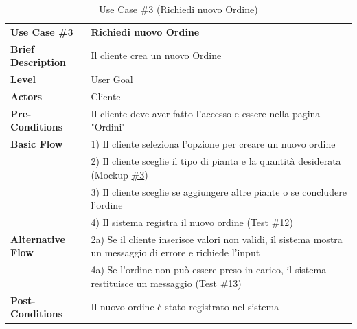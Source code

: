 \documentclass{article}
\begin{document}
    
    \begin{table}[p]
        \begin{tabularx}{\textwidth}{ | l  X | }
            \rowcolor{lightgray!70}
            \hline
            \textbf{Use Case \#3} & \textbf{Richiedi nuovo Ordine} \\[0.5ex]
            \textbf{Brief Description} & Il cliente crea un nuovo Ordine \\
            \rowcolor{blue!10}
            \textbf{Level} & User Goal \\
            \textbf{Actors} & Cliente \\
            \rowcolor{blue!10}
            \textbf{Pre-Conditions} & Il cliente deve aver fatto l'accesso e essere nella pagina "Ordini" \\
            \textbf{Basic Flow} & 1) Il cliente seleziona l'opzione per creare un nuovo ordine\\
            & 2) Il cliente sceglie il tipo di pianta e la quantità desiderata (Mockup \hyperref[fig:mockup_3]{\#3})\\
            & 3) Il cliente sceglie se aggiungere altre piante o se concludere l'ordine\\
            & 4) Il sistema registra il nuovo ordine (Test \hyperref[test_12]{\#12})\\
            \rowcolor{blue!10}
            \textbf{Alternative Flow} & 2a) Se il cliente inserisce valori non validi, il sistema mostra un messaggio di errore e richiede l'input  \\
            \rowcolor{blue!10}
            & 4a) Se l'ordine non può essere preso in carico, il sistema restituisce un messaggio (Test \hyperref[test_13]{\#13})\\
            \textbf{Post-Conditions} & Il nuovo ordine è stato registrato nel sistema \\
            \hline
        \end{tabularx}
        \label{use_case_3}
        \caption{Use Case \#3 (Richiedi nuovo Ordine)}
    \end{table}
    
\end{document}
